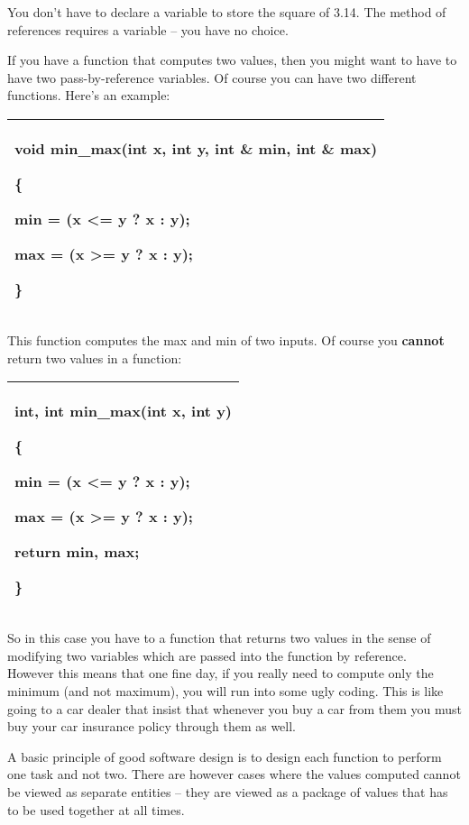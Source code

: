 \documentclass[
]{article}
\begin{document}
You don't have to declare a variable to store the square of 3.14. The
method of references requires a variable -- you have no choice.

If you have a function that computes two values, then you might want to
have to have two pass-by-reference variables. Of course you can have two
different functions. Here's an example:

\begin{longtable}[]{@{}l@{}}
\toprule
\endhead
\begin{minipage}[t]{0.97\columnwidth}\raggedright
void min\_max(int x, int y, int \& min, int \& max)

\{

min = (x \textless= y ? x : y);

max = (x \textgreater= y ? x : y);

\}\strut
\end{minipage}\tabularnewline
\bottomrule
\end{longtable}

This function computes the max and min of two inputs. Of course you
\textbf{cannot} return two values in a function:

\begin{longtable}[]{@{}l@{}}
\toprule
\endhead
\begin{minipage}[t]{0.97\columnwidth}\raggedright
\textbf{int, int} min\_max(int x, int y)

\{

min = (x \textless= y ? x : y);

max = (x \textgreater= y ? x : y);

return \textbf{min, max};

\}\strut
\end{minipage}\tabularnewline
\bottomrule
\end{longtable}

So in this case you have to a function that returns two values in the
sense of modifying two variables which are passed into the function by
reference.\\

However this means that one fine day, if you really need to compute only
the minimum (and not maximum), you will run into some ugly coding. This
is like going to a car dealer that insist that whenever you buy a car
from them you must buy your car insurance policy through them as well.

A basic principle of good software design is to design each function to
perform one task and not two. There are however cases where the values
computed cannot be viewed as separate entities -- they are viewed as a
package of values that has to be used together at all times.
\end{document}
